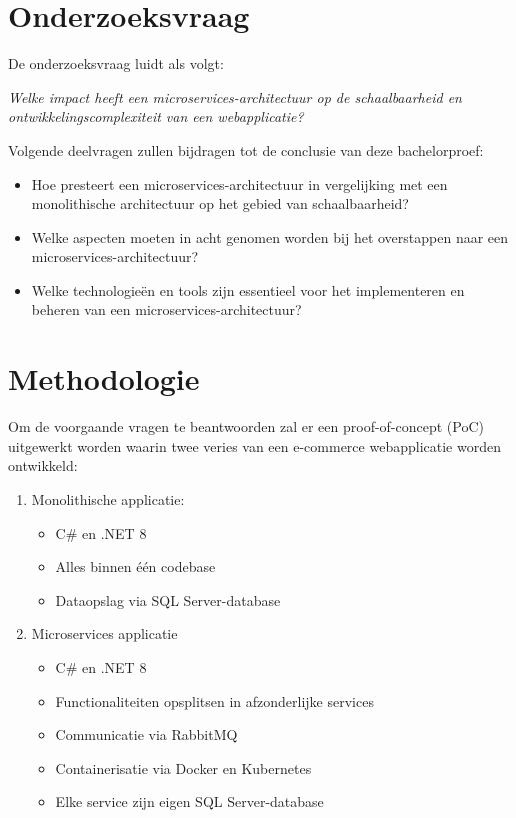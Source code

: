 \section{Onderzoeksvraag}

De onderzoeksvraag luidt als volgt:

\textit{Welke impact heeft een microservices-architectuur op de schaalbaarheid en ontwikkelingscomplexiteit van een webapplicatie?}

Volgende deelvragen zullen bijdragen tot de conclusie van deze bachelorproef:

\begin{itemize}
	\item Hoe presteert een microservices-architectuur in vergelijking met een monolithische architectuur op het gebied van schaalbaarheid?
	\item Welke aspecten moeten in acht genomen worden bij het overstappen naar een microservices-architectuur?
	\item Welke technologieën en tools zijn essentieel voor het implementeren en beheren van een microservices-architectuur?
\end{itemize}

\section{Methodologie}

Om de voorgaande vragen te beantwoorden zal er een proof-of-concept (PoC) uitgewerkt worden waarin twee veries van een e-commerce webapplicatie worden ontwikkeld:

\begin{enumerate}
	\item Monolithische applicatie:
	\begin{itemize}
		\item C\# en .NET 8
		\item Alles binnen één codebase
		\item Dataopslag via SQL Server-database
	\end{itemize}
	\item Microservices applicatie
	\begin{itemize}
		\item C\# en .NET 8
		\item Functionaliteiten opsplitsen in afzonderlijke services
		\item Communicatie via RabbitMQ
		\item Containerisatie via Docker en Kubernetes
		\item Elke service zijn eigen SQL Server-database
	\end{itemize}
\end{enumerate}

